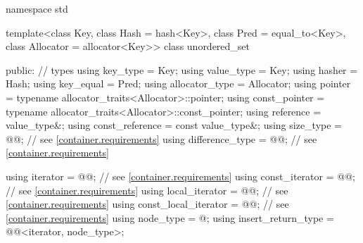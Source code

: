 %
\begin{codeblock}
namespace std {
  template<class Key,
           class Hash = hash<Key>,
           class Pred = equal_to<Key>,
           class Allocator = allocator<Key>>
  class unordered_set {
  public:
    // types
    using key_type             = Key;
    using value_type           = Key;
    using hasher               = Hash;
    using key_equal            = Pred;
    using allocator_type       = Allocator;
    using pointer              = typename allocator_traits<Allocator>::pointer;
    using const_pointer        = typename allocator_traits<Allocator>::const_pointer;
    using reference            = value_type&;
    using const_reference      = const value_type&;
    using size_type            = @@; // see \ref{container.requirements}
    using difference_type      = @@; // see \ref{container.requirements}

    using iterator             = @@; // see \ref{container.requirements}
    using const_iterator       = @@; // see \ref{container.requirements}
    using local_iterator       = @@; // see \ref{container.requirements}
    using const_local_iterator = @@; // see \ref{container.requirements}
    using node_type            = @\unspec@;
    using insert_return_type   = @@<iterator, node_type>;

}}
\end{codeblock}
